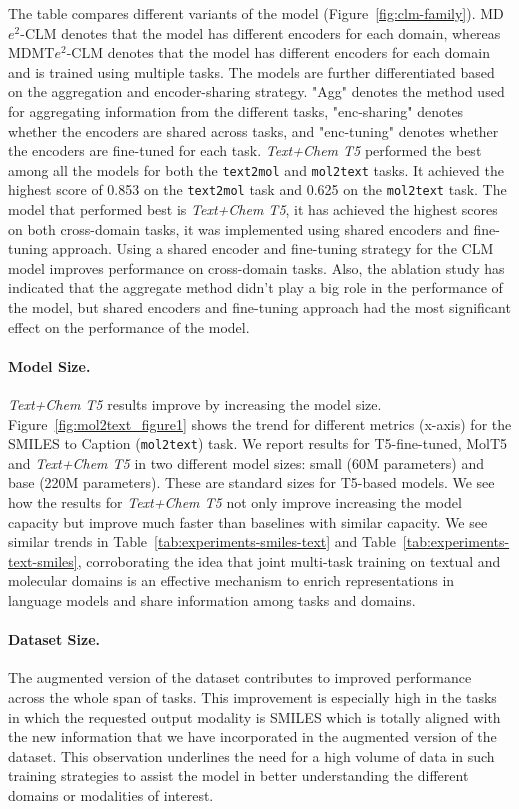 \documentclass[nohyperref]{article}
\theoremstyle{plain}
\theoremstyle{definition}
\theoremstyle{remark}
\begin{document}
The table compares different variants of the model (Figure~\ref{fig:clm-family}). MD$e^2$-CLM denotes that the model has different encoders for each domain, whereas MDMT$e^2$-CLM denotes that the model has different encoders for each domain and is trained using multiple tasks. The models are further differentiated based on the aggregation and encoder-sharing strategy. "Agg" denotes the method used for aggregating information from the different tasks, "enc-sharing" denotes whether the encoders are shared across tasks, and "enc-tuning" denotes whether the encoders are fine-tuned for each task.
\emph{Text+Chem T5}  performed the best among all the models for both the \texttt{text2mol} and \texttt{mol2text} tasks. It achieved the highest score of 0.853 on the \texttt{text2mol} task and 0.625 on the \texttt{mol2text} task.
The model that performed best is\textit{ Text+Chem T5}, it has achieved the highest scores on both cross-domain tasks, it was implemented using shared encoders and fine-tuning approach.
Using a shared encoder and fine-tuning strategy for the CLM model improves performance on cross-domain tasks. Also, the ablation study has indicated that the aggregate method didn't play a big role in the performance of the model, but shared encoders and fine-tuning approach had the most significant effect on the performance of the model.

\paragraph{Model Size.}
\emph{Text+Chem T5}  results improve by increasing the model size.
Figure~\ref{fig:mol2text_figure1} shows the trend for different metrics (x-axis) for the SMILES to Caption (\texttt{mol2text}) task. 
We report results for T5-fine-tuned, MolT5 and \emph{Text+Chem T5}  in two different model sizes: small (60M parameters) and base (220M parameters). These are standard sizes for T5-based models.
We see how the results for \emph{Text+Chem T5}  not only improve increasing the model capacity but improve much faster than baselines with similar capacity. We see similar trends in Table~\ref{tab:experiments-smiles-text} and Table~\ref{tab:experiments-text-smiles}, corroborating the idea that joint multi-task training on textual and molecular domains is an effective mechanism to enrich representations in language models and share information among tasks and domains.

\paragraph{Dataset Size.}
The augmented version of the dataset contributes to improved performance across the whole span of tasks. This improvement is especially high in the tasks in which the requested output modality is SMILES which is totally aligned with the new information that we have incorporated in the augmented version of the dataset. This observation underlines the need for a high volume of data in such training strategies to assist the model in better understanding the different domains or modalities of interest. 
\end{document}
